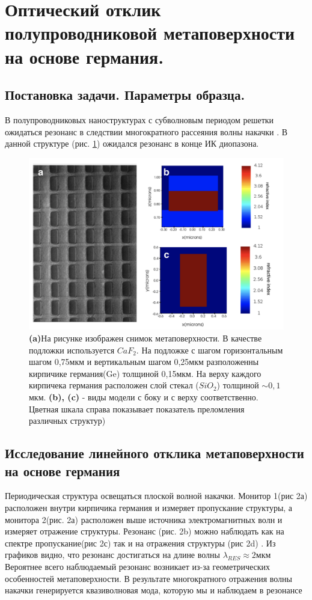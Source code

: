 \section{Оптический отклик полупроводниковой метаповерхности на основе германия.}

\subsection{Постановка задачи. Параметры образца.}
В полупроводниковых наноструктурах с субволновым периодом решетки ожидаться резонанс в следствии многократного рассеяния  волны накачки \cite{mftiOpt}. В данной структуре (рис. \ref{base1}) ожидался резонанс в конце ИК диопазона.

\begin{figure}[h]
	\centering
    \includegraphics[width=0.8\linewidth]{images/base1.png}
	\caption{\textbf{(a)}На рисунке изображен снимок метаповерхности. В качестве подложки используется $CaF_2$. На подложке с шагом горизонтальным шагом 0,75мкм и вертикальным шагом 0,25мкм разположенны кирпичике германия(Ge) толщиной 0,15мкм. На верху каждого кирпичека германия расположен слой стекал ($SiO_2$) толщиной $\sim 0,1$мкм. \textbf{(b), (c)} - виды модели с боку и с верху соответственно. Цветная шкала справа показывает показатель преломления различных структур)}
	\label{base1}
\end{figure}

\subsection{Исследование линейного отклика метаповерхности на основе германия}
\hspace{2mm}
Периодическая структура освещаться плоской волной накачки. Монитор 1(рис 2а) расположен внутри кирпичика германия и измеряет пропускание структуры, а монитора 2(рис.  2а) расположен выше источника электромагнитных волн и измеряет отражение структуры. Резонанс (рис. 2b) можно наблюдать как на спектре пропускание(рис 2с) так и на отражения структуры (рис 2d) .  Из графиков видно, что резонанс достигаться на длине волны  $\lambda_{RES} \approx 2$мкм
\hspace{2mm}
 Вероятнее всего наблюдаемый резонанс возникает из-за геометрических особенностей метаповерхности. В результате многократного отражения волны накачки генерируется квазиволновая мода, которую мы и наблюдаем в резонансе 



